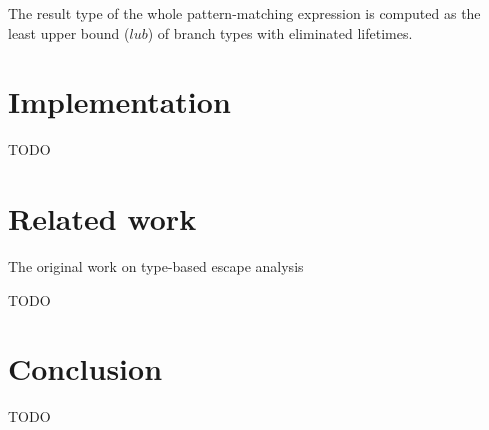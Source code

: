 \documentclass[11pt]{article}
\begin{document}
    The result type of the whole pattern-matching expression is computed as the least upper bound ($lub$) of branch types with eliminated lifetimes.


    \section{Implementation} \label{sec:implementation}

    TODO %


    \section{Related work} \label{sec:related-work}

    The original work on type-based escape analysis~\cite{hannan1998type}


    TODO %


    \section{Conclusion}

    TODO %

    
    
\end{document}
